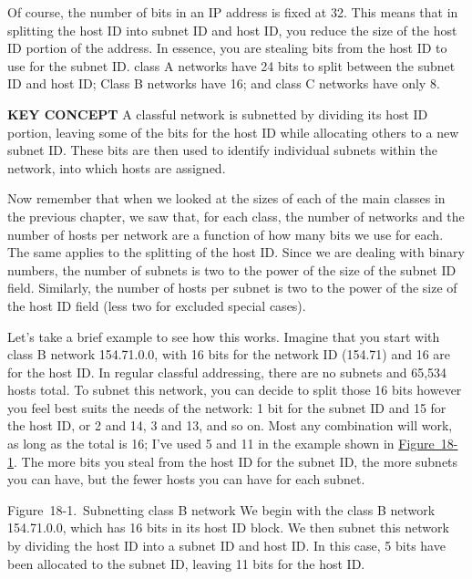 \documentclass[b5paper,11pt]{memoir}
\begin{document}
Of course, the number of bits in an IP address is fixed at 32. This
means that in splitting the host ID into subnet ID and host ID, you
reduce the size of the host ID portion of the address. In essence, you
are stealing bits from the host ID to use for the subnet ID. class A
networks have 24 bits to split between the subnet ID and host ID; Class
B networks have 16; and class C networks have only 8.


{\textbf{KEY CONCEPT}} A classful network is subnetted by dividing its
host ID portion, leaving some of the bits for the host ID while
allocating others to a new subnet ID. These bits are then used to
identify individual subnets within the network, into which hosts are
assigned.

Now remember that when we looked at the sizes of each of the main
classes in the previous chapter, we saw that, for each class, the number
of networks and the number of hosts per network are a function of how
many bits we use for each. The same applies to the splitting of the host
ID. Since we are dealing with binary numbers, the number of subnets is
two to the power of the size of the subnet ID field. Similarly, the
number of hosts per subnet is two to the power of the size of the host
ID field (less two for excluded special cases).

Let's take a brief example to see how this works. Imagine that you start
with class B network 154.71.0.0, with 16 bits for the network ID
(154.71) and 16 are for the host ID. In regular classful addressing,
there are no subnets and 65,534 hosts total. To subnet this network, you
can decide to split those 16 bits however you feel best suits the needs
of the network: 1 bit for the subnet ID and 15 for the host ID, or 2 and
14, 3 and 13, and so on. Most any combination will work, as long as the
total is 16; I've used 5 and 11 in the example shown in
\protect\hyperlink{ch18s02.htmlux5cux23subnetting_class_b_network_we_begin_with}{Figure~18-1}.
The more bits you steal from the host ID for the subnet ID, the more
subnets you can have, but the fewer hosts you can have for each subnet.

\protect\hypertarget{ch18s02.htmlux5cux23subnetting_class_b_network_we_begin_with}{}{}

\protect\hypertarget{ch18s02.htmlux5cux23I_mediaobject4_d1e18151}{}{}

Figure~18-1.~Subnetting class B network We begin with the class B
network 154.71.0.0, which has 16 bits in its host ID block. We then
subnet this network by dividing the host ID into a subnet ID and host
ID. In this case, 5 bits have been allocated to the subnet ID, leaving
11 bits for the host ID.
\end{document}
